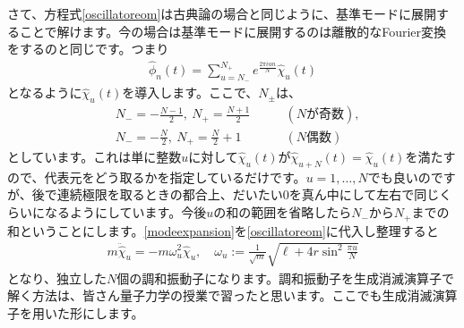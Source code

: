 \documentclass[report,paper=a4, fontsize=12pt, line_length=16cm, number_of_lines=33,dvipdfmx]{jlreq}
\numberwithin{equation}{chapter}
\newcommand{\phih}{\hat{\phi}}
\newcommand{\chih}{\hat{\chi}}
\begin{document}
さて、方程式\eqref{oscillatoreom}は古典論の場合と同じように、基準モードに展開することで解けます。今の場合は基準モードに展開するのは離散的なFourier変換をするのと同じです。つまり
\begin{align}
  \phih_n(t)=\sum_{u=N_{-}}^{N_{+}}e^{\frac{2\pi i u n}{N}}\chih_{u}(t)\label{modeexpansion}
\end{align}
となるように$\chih_{u}(t)$を導入します。ここで、$N_{\pm}$は、
\begin{align}
  &N_{-}=-\frac{N-1}{2},\ N_{+}=\frac{N+1}{2}\qquad &(N \text{が奇数}),\\ 
  &N_{-}=-\frac{N}{2},\ N_{+}=\frac{N}{2}+1\qquad &(N \text{偶数})
\end{align}
としています。これは単に整数$u$に対して$\chih_u(t)$が$\chih_{u+N}(t)=\chih_{u}(t)$を満たすので、代表元をどう取るかを指定しているだけです。$u=1,\dots, N$でも良いのですが、後で連続極限を取るときの都合上、だいたい$0$を真ん中にして左右で同じくらいになるようにしています。今後$u$の和の範囲を省略したら$N_{-}$から$N_{+}$までの和ということにします。\eqref{modeexpansion}を\eqref{oscillatoreom}に代入し整理すると
\begin{align}
  m\ddot{\chih}_{u}=-m\omega_{u}^2\chih_{u},\quad
  \omega_{u}:=\frac{1}{\sqrt{m}}\sqrt{\ell+4r\sin^2\frac{\pi u}{N}}\label{modeeom}
\end{align}
となり、独立した$N$個の調和振動子になります。調和振動子を生成消滅演算子で解く方法は、皆さん量子力学の授業で習ったと思います。ここでも生成消滅演算子を用いた形にします。
\end{document}
